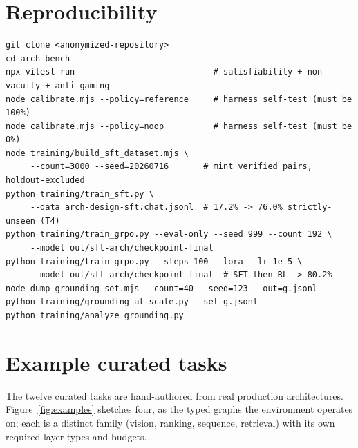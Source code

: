 \documentclass{article}
\begin{document}
\section*{Reproducibility}
\begin{verbatim}
git clone <anonymized-repository>
cd arch-bench
npx vitest run                            # satisfiability + non-vacuity + anti-gaming
node calibrate.mjs --policy=reference     # harness self-test (must be 100%)
node calibrate.mjs --policy=noop          # harness self-test (must be 0%)
node training/build_sft_dataset.mjs \
     --count=3000 --seed=20260716       # mint verified pairs, holdout-excluded
python training/train_sft.py \
     --data arch-design-sft.chat.jsonl  # 17.2% -> 76.0% strictly-unseen (T4)
python training/train_grpo.py --eval-only --seed 999 --count 192 \
     --model out/sft-arch/checkpoint-final
python training/train_grpo.py --steps 100 --lora --lr 1e-5 \
     --model out/sft-arch/checkpoint-final  # SFT-then-RL -> 80.2%
node dump_grounding_set.mjs --count=40 --seed=123 --out=g.jsonl
python training/grounding_at_scale.py --set g.jsonl
python training/analyze_grounding.py
\end{verbatim}

\appendix
\section{Example curated tasks}
\label{app:examples}
The twelve curated tasks are hand-authored from real production architectures. Figure~\ref{fig:examples} sketches four, as the typed graphs the environment operates on; each is a distinct family (vision, ranking, sequence, retrieval) with its own required layer types and budgets.
\end{document}
